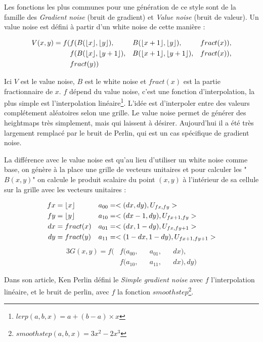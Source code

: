 \documentclass{EPUProjetDi}
\DeclarePairedDelimiter\floor{\lfloor}{\rfloor}%
\DeclarePairedDelimiter\fract{fract(}{)}
\begin{document}
Les fonctions les plus communes pour une génération de ce style sont de la famille des \textit{Gradient noise} (bruit de gradient) et \textit{Value noise} (bruit de valeur).
Un value noise est défini à partir d'un white noise de cette manière :

\begin{alignat*}{3}
	V(x,y) =f( &f(B(\floor{x},\floor{y}), &&B(\floor{x+1},\floor{y}), &&\fract{x}),\\
			&f(B(\floor{x},\floor{y+1}), &&B(\floor{x+1},\floor{y+1}), &&\fract{x}),\\
			&\fract{y})
\end{alignat*}

Ici $V$ est le value noise, $B$ est le white noise et $fract(x)$ est la partie fractionnaire de $x$. $f$ dépend du value noise, c'est une fonction d'interpolation, la plus simple est l'interpolation linéaire\footnote{$lerp(a,b,x) = a+(b-a)\times x$}.
L'idée est d'interpoler entre des valeurs complétement aléatoires selon une grille. Le value noise permet de générer des heightmaps très simplement, mais qui laissent à désirer. Aujourd'hui il a été très largement remplacé par le bruit de Perlin, qui est un cas spécifique de gradient noise.

La différence avec le value noise est qu'au lieu d'utiliser un white noise comme base, on génère à la place une grille de vecteurs unitaires et pour calculer les "$B(x,y)$" on calcule le produit scalaire du point $(x,y)$ à l'intérieur de sa cellule sur la grille avec les vecteurs unitaires :

\begin{align*}
	fx&=\floor{x} & a_{00}&=<(dx,dy), U_{fx,fy}>\\
	fy&=\floor{y} & a_{10}&=<(dx-1,dy), U_{fx+1,fy}>\\
	dx&=\fract{x} & a_{01}&=<(dx,1-dy), U_{fx,fy+1}>\\
	dy&=\fract{y} & a_{11}&=<(1-dx,1-dy), U_{fx+1,fy+1}>
\end{align*}
\begin{alignat*}{3}
	G(x,y) =f( &f(a_{00}, &&a_{01}, &&dx),\\
			&f(a_{10}, &&a_{11}, &&dx), dy)
\end{alignat*}

Dans son article\cite{perlinnoise}, Ken Perlin défini le \textit{Simple gradient noise} avec $f$ l'interpolation linéaire, et le bruit de perlin, avec $f$ la fonction $smoothstep$\footnote{$smoothstep(a,b,x) = 3x^2-2x^3$}.
\end{document}

